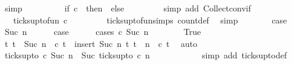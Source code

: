 \begin{isabellebody}
\ simp\isanewline
\ \ \ \ \isamarkupfalse%
\ \isamarkupfalse%
\ {\isacartoucheopen}{\isachardot}{\isachardot}{\isachardot}\ {\isacharequal}\ {\isacharparenleft}if\ c\ {}\ then\ {}\ else\ {}{\isacharparenright}{\isacartoucheclose}\isanewline
\ \ \ \ \ \ \isamarkupfalse%
\ {\isacharparenleft}simp\ add{\isacharcolon}\ Collect{\isacharunderscore}conv{\isacharunderscore}if{\isacharparenright}\isanewline
\ \ \ \ \isamarkupfalse%
\ \isamarkupfalse%
\ {\isacartoucheopen}{\isachardot}{\isachardot}{\isachardot}\ {\isacharequal}\ ticks{\isacharunderscore}up{\isacharunderscore}to{\isacharunderscore}fun\ c\ {}{\isacartoucheclose}\isanewline
\ \ \ \ \ \ \isamarkupfalse%
\ ticks{\isacharunderscore}up{\isacharunderscore}to{\isacharunderscore}fun{\isachardot}simps{\isacharparenleft}{}{\isacharparenright}\ count{\isacharunderscore}def\ \isamarkupfalse%
\ simp\isanewline
\ \ \ \ \isamarkupfalse%
\ \isamarkupfalse%
\ {\isacharquery}case\ \isacommand{{\isachardot}}\isamarkupfalse%
\isanewline
{}\isamarkupfalse%
\isanewline
\ \ \isamarkupfalse%
\ {\isacharparenleft}Suc\ n{\isacharparenright}\isanewline
\ \ \ \ \isamarkupfalse%
\ {\isacharquery}case\isanewline
\ \ \ \ \isamarkupfalse%
\ {\isacharparenleft}cases\ {\isacartoucheopen}c\ {\isacharparenleft}Suc\ n{\isacharparenright}{\isacartoucheclose}{\isacharparenright}\isanewline
\ \ \ \ \ \ \isamarkupfalse%
\ True\isanewline
\ \ \ \ \ \ \ \ \isamarkupfalse%
\ {\isacartoucheopen}{\isacharbraceleft}t{\isachardot}\ t\ {\isasymle}\ Suc\ n\ {\isasymand}\ c\ t{\isacharbraceright}\ {\isacharequal}\ insert\ {\isacharparenleft}Suc\ n{\isacharparenright}\ {\isacharbraceleft}t{\isachardot}\ t\ {\isasymle}\ n\ {\isasymand}\ c\ t{\isacharbraceright}{\isacartoucheclose}\ \isamarkupfalse%
\ auto\isanewline
\ \ \ \ \ \ \ \ \isamarkupfalse%
\ {\isacartoucheopen}ticks{\isacharunderscore}up{\isacharunderscore}to\ c\ {\isacharparenleft}Suc\ n{\isacharparenright}\ {\isacharequal}\ Suc\ {\isacharparenleft}ticks{\isacharunderscore}up{\isacharunderscore}to\ c\ n{\isacharparenright}{\isacartoucheclose}\isanewline
\ \ \ \ \ \ \ \ \ \ \isamarkupfalse%
\ {\isacharparenleft}simp\ add{\isacharcolon}\ ticks{\isacharunderscore}up{\isacharunderscore}to{\isacharunderscore}def{\isacharparenright}\isanewline

\end{isabellebody}
